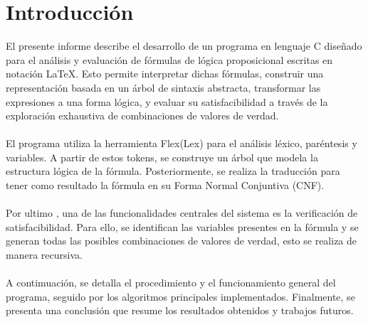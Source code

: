 \documentclass{article}
\begin{document}
\section{Introducci\'on}
% 
 El presente informe describe el desarrollo de un programa en lenguaje C diseñado para el análisis y evaluación de fórmulas de lógica proposicional escritas en notación \LaTeX{}. Esto permite interpretar dichas fórmulas, construir una representación basada en un árbol de sintaxis abstracta, transformar las expresiones a una forma lógica, y evaluar su satisfacibilidad a través de la exploración exhaustiva de combinaciones de valores de verdad.\\\\
 El programa utiliza la herramienta Flex(Lex) para el análisis léxico, paréntesis y variables. A partir de estos tokens, se construye un árbol que modela la estructura lógica de la fórmula. Posteriormente, se realiza la traducción para tener como resultado la fórmula en su Forma Normal Conjuntiva (CNF). \\\\
 Por ultimo , una de las funcionalidades centrales del sistema es la verificación de satisfacibilidad. Para ello, se identifican las variables presentes en la fórmula y se generan todas las posibles combinaciones de valores de verdad, esto se realiza de manera recursiva.\\\\
 A contimuación, se detalla el procedimiento y el funcionamiento general del programa, seguido por los algoritmos principales implementados. Finalmente, se presenta una conclusión que resume los resultados obtenidos y trabajos futuros. 


\end{document}
